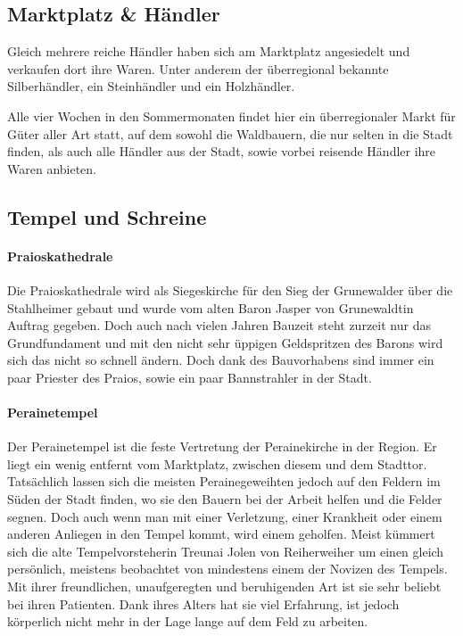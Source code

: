 \subsection{Marktplatz \& Händler}
Gleich mehrere reiche Händler haben sich am Marktplatz angesiedelt und verkaufen dort ihre Waren. Unter anderem der überregional bekannte Silberhändler, ein Steinhändler und ein Holzhändler.

Alle vier Wochen in den Sommermonaten findet hier ein überregionaler Markt für Güter aller Art statt, auf dem sowohl die Waldbauern, die nur selten in die Stadt finden, als auch alle Händler aus der Stadt, sowie vorbei reisende Händler ihre Waren anbieten.

\subsection{Tempel und Schreine}
\paragraph{Praioskathedrale}
Die Praioskathedrale wird als Siegeskirche für den Sieg der Grunewalder über die Stahlheimer gebaut und wurde vom alten Baron Jasper von Grunewaldtin Auftrag gegeben. Doch auch nach vielen Jahren Bauzeit steht zurzeit nur das Grundfundament und mit den nicht sehr üppigen Geldspritzen des Barons wird sich das nicht so schnell ändern. Doch dank des Bauvorhabens sind immer ein paar Priester des Praios, sowie ein paar Bannstrahler in der Stadt.   

\paragraph{Perainetempel}
Der Perainetempel ist die feste Vertretung der Perainekirche in der Region. Er liegt ein wenig entfernt vom Marktplatz, zwischen diesem und dem Stadttor. Tatsächlich lassen sich die meisten Perainegeweihten jedoch auf den Feldern im Süden der Stadt finden, wo sie den Bauern bei der Arbeit helfen und die Felder segnen. Doch auch wenn man mit einer Verletzung, einer Krankheit oder einem anderen Anliegen in den Tempel kommt, wird einem geholfen. Meist kümmert sich die alte Tempelvorsteherin Treunai Jolen von Reiherweiher um einen gleich persönlich, meistens beobachtet von mindestens einem der Novizen des Tempels. Mit ihrer freundlichen, unaufgeregten und beruhigenden Art ist sie sehr beliebt bei ihren Patienten. Dank ihres Alters hat sie viel Erfahrung, ist jedoch körperlich nicht mehr in der Lage lange auf dem Feld zu arbeiten. 

